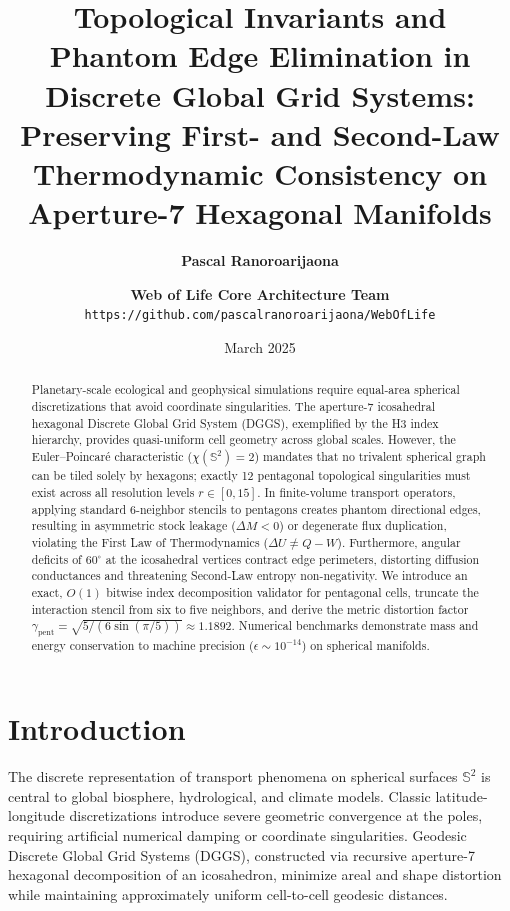 \documentclass[10pt,twocolumn]{article}
\title{\textbf{Topological Invariants and Phantom Edge Elimination in Discrete Global Grid Systems: Preserving First- and Second-Law Thermodynamic Consistency on Aperture-7 Hexagonal Manifolds}}
\author{
  \textbf{Pascal Ranoroarijaona} \and \textbf{Web of Life Core Architecture Team} \\
  \texttt{https://github.com/pascalranoroarijaona/WebOfLife}
}
\date{March 2025}
\begin{document}
\maketitle

\begin{abstract}
Planetary-scale ecological and geophysical simulations require equal-area spherical discretizations that avoid coordinate singularities. The aperture-7 icosahedral hexagonal Discrete Global Grid System (DGGS), exemplified by the H3 index hierarchy, provides quasi-uniform cell geometry across global scales. However, the Euler--Poincaré characteristic ($\chi(\mathbb{S}^2) = 2$) mandates that no trivalent spherical graph can be tiled solely by hexagons; exactly 12 pentagonal topological singularities must exist across all resolution levels $r \in [0, 15]$. In finite-volume transport operators, applying standard 6-neighbor stencils to pentagons creates phantom directional edges, resulting in asymmetric stock leakage ($\Delta M < 0$) or degenerate flux duplication, violating the First Law of Thermodynamics ($\Delta U \ne Q - W$). Furthermore, angular deficits of $60^\circ$ at the icosahedral vertices contract edge perimeters, distorting diffusion conductances and threatening Second-Law entropy non-negativity. We introduce an exact, $O(1)$ bitwise index decomposition validator for pentagonal cells, truncate the interaction stencil from six to five neighbors, and derive the metric distortion factor $\gamma_{\text{pent}} = \sqrt{5 / (6 \sin(\pi/5))} \approx 1.1892$. Numerical benchmarks demonstrate mass and energy conservation to machine precision ($\epsilon \sim 10^{-14}$) on spherical manifolds.
\end{abstract}

\section{Introduction}

The discrete representation of transport phenomena on spherical surfaces $\mathbb{S}^2$ is central to global biosphere, hydrological, and climate models. Classic latitude-longitude discretizations introduce severe geometric convergence at the poles, requiring artificial numerical damping or coordinate singularities. Geodesic Discrete Global Grid Systems (DGGS), constructed via recursive aperture-7 hexagonal decomposition of an icosahedron, minimize areal and shape distortion while maintaining approximately uniform cell-to-cell geodesic distances.
\end{document}
